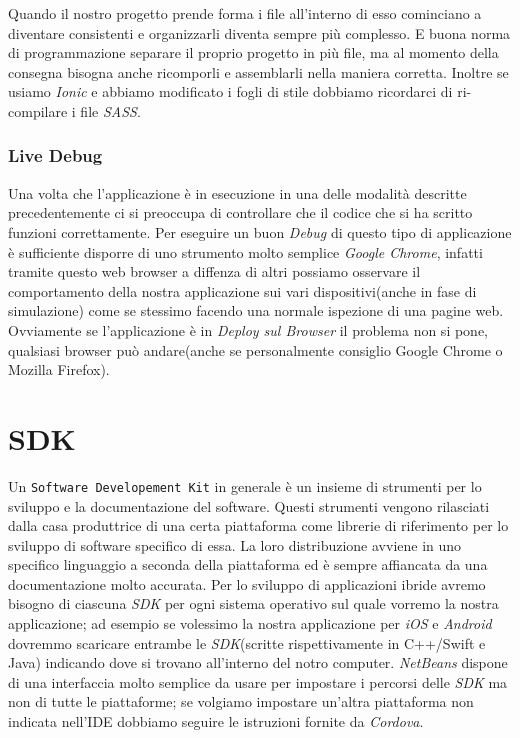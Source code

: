 Quando il nostro progetto prende forma i file all'interno di esso cominciano a diventare consistenti e organizzarli diventa sempre più complesso. E buona norma di programmazione separare il proprio progetto in più file, ma al momento della consegna bisogna anche ricomporli e assemblarli nella maniera corretta. Inoltre se usiamo \emph{Ionic} e abbiamo modificato i fogli di stile dobbiamo ricordarci di ri-compilare i file \emph{SASS}.\\

\subsubsection{Live Debug}
Una volta che l'applicazione è in esecuzione in una delle modalità descritte precedentemente ci si preoccupa di controllare che il codice che si ha scritto funzioni correttamente. Per eseguire un buon \emph{Debug} di questo tipo di applicazione è sufficiente disporre di uno strumento molto semplice \emph{Google Chrome}, infatti tramite questo web browser a diffenza di altri possiamo osservare il comportamento della nostra applicazione sui vari dispositivi(anche in fase di simulazione) come se stessimo facendo una normale ispezione di una pagine web. Ovviamente se l'applicazione è in \emph{Deploy sul Browser} il problema non si pone, qualsiasi browser può andare(anche se personalmente consiglio Google Chrome o Mozilla Firefox).

\section{SDK}
Un \texttt{Software Developement Kit} in generale è un insieme di strumenti per lo sviluppo e la documentazione del software\cite{wiki:sdk}. Questi strumenti vengono rilasciati dalla casa produttrice di una certa piattaforma come librerie di riferimento per lo sviluppo di software specifico di essa. La loro distribuzione avviene in uno specifico linguaggio a seconda della piattaforma ed è sempre affiancata da una documentazione molto accurata. 
Per lo sviluppo di applicazioni ibride avremo bisogno di ciascuna \emph{SDK} per ogni sistema operativo sul quale vorremo la nostra applicazione; ad esempio se volessimo la nostra applicazione per \emph{iOS} e \emph{Android} dovremmo scaricare entrambe le \emph{SDK}(scritte rispettivamente in C++/Swift e Java) indicando dove si trovano all'interno del notro computer. \emph{NetBeans} dispone di una interfaccia molto semplice da usare per impostare i percorsi delle \emph{SDK} ma non di tutte le piattaforme; se volgiamo impostare un'altra piattaforma non indicata nell'IDE dobbiamo seguire le istruzioni fornite da \emph{Cordova}.